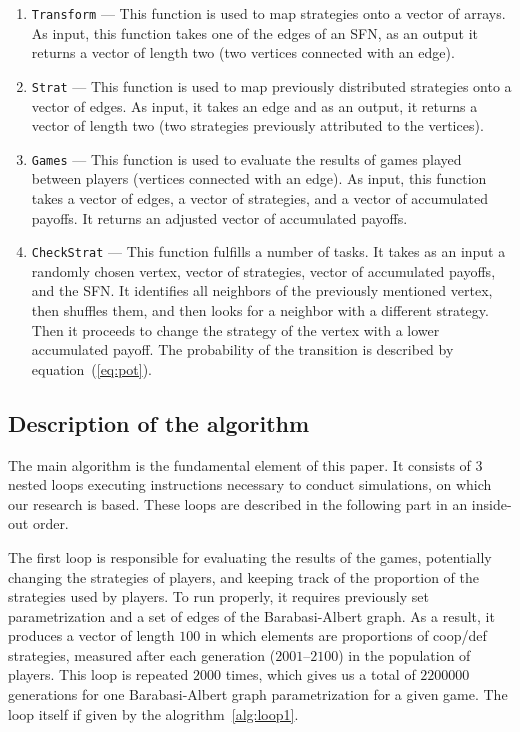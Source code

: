\documentclass[english, twoside, 12pt, a4paper]{article}
\theoremstyle{definition}
\theoremstyle{plain}
\theoremstyle{remark}
\begin{document}
\begin{enumerate}
  \item \lstinline+Transform+ --- This function is used to map strategies onto a vector of arrays. As input, this function takes one of the edges of an SFN, as an output it returns a vector of length two (two vertices connected with an edge).
  \item \lstinline+Strat+ --- This function is used to map previously distributed strategies onto a vector of edges. As input, it takes an edge and as an output, it returns a vector of length two (two strategies previously attributed to the vertices).
  \item \lstinline+Games+ --- This function is used to evaluate the results of games played between players (vertices connected with an edge). As input, this function takes a vector of edges, a vector of strategies, and a vector of accumulated payoffs. It returns an adjusted vector of accumulated payoffs.
  \item \lstinline+CheckStrat+ --- This function fulfills a number of tasks. It takes as an input a randomly chosen vertex, vector of strategies, vector of accumulated payoffs, and the SFN. It identifies all neighbors of the previously mentioned vertex, then shuffles them, and then looks for a neighbor with a different strategy. Then it proceeds to change the strategy of the vertex with a lower accumulated payoff. The probability of the transition is described by equation~(\ref{eq:pot}).
\end{enumerate}

\subsection{Description of the algorithm}

The main algorithm is the fundamental element of this paper. It consists of 3 nested loops executing instructions necessary to conduct simulations, on which our research is based. These loops are described in the following part in an inside-out order. 

The first loop is responsible for evaluating the results of the games, potentially changing the strategies of players, and keeping track of the proportion of the strategies used by players. To run properly, it requires previously set parametrization and a set of edges of the Barabasi-Albert graph. As a result, it produces a vector of length \(100\) in which elements are proportions of coop/def strategies, measured after each generation (\(2001\)--\(2100\)) in the population of players. This loop is repeated \(2000\) times, which gives us a total of \(2200000\) generations for one Barabasi-Albert graph parametrization for a given game.
The loop itself if given by the alogrithm~\ref{alg:loop1}.
\end{document}

